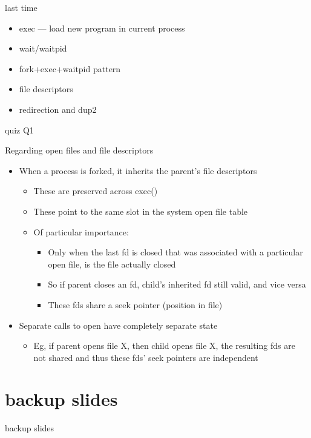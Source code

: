 \date{}
\title{}
\date{}

\begin{frame}
    \titlepage
\end{frame}



\begin{frame}{last time}
    \begin{itemize}
    \item exec --- load new program in current process
    \item wait/waitpid
    \item fork+exec+waitpid pattern
    \item file descriptors
    \item redirection and dup2
    \end{itemize}
\end{frame}

\begin{frame}{quiz Q1}
\end{frame}

\begin{frame}{Regarding open files and file descriptors}
\begin{itemize}
  \item	When a process is forked, it inherits the parent’s file descriptors
  \begin{itemize} 
    \item These are preserved across exec()
    \item These point to the same slot in the system open file table
    \item Of particular importance:
    \begin{itemize}
      \item Only when the last fd is closed that was associated with a particular open file, is the file actually closed
      \item So if parent closes an fd, child’s inherited fd still valid, and vice versa
      \item These fds share a seek pointer (position in file)
    \end{itemize}
  \end{itemize}
  \item Separate calls to open have completely separate state
  \begin{itemize}
    \item Eg, if parent opens file X, then child opens file X, the resulting fds are not shared and thus these fds’ seek pointers are independent 
  \end{itemize}
\end{itemize}
\end{frame}






\section{backup slides}
\begin{frame}{backup slides}
\end{frame}





